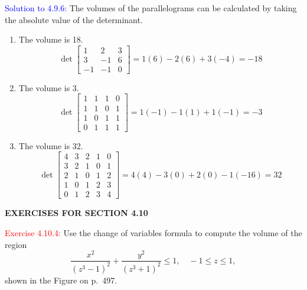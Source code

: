 \documentclass[12pt]{article}
\begin{document}
\textcolor{blue}{Solution to 4.9.6:}
The volumes of the parallelograms can be calculated 
by taking the absolute value of the determinant.
\begin{enumerate}
    \item 
        The volume is 18.
        \[
        \det 
        \begin{bmatrix}
            1 & 2 & 3 \\
            3 & -1 & 6 \\
            -1 & -1 & 0
        \end{bmatrix} 
        = 1(6)-2(6)+3(-4)
        =-18
        \]
        
    \item 
        The volume is 3.
        \[
        \det 
        \begin{bmatrix}
            1 & 1 & 1 & 0 \\
            1 & 1 & 0 & 1 \\
            1 & 0 & 1 & 1 \\
            0 & 1 & 1 & 1
        \end{bmatrix}
        = 1(-1) - 1(1) +1(-1)
        = -3
        \]
    \item 
        The volume is 32.
        \[
        \det 
        \begin{bmatrix}
            4 & 3 & 2 & 1 & 0 \\
            3 & 2 & 1 & 0 & 1 \\
            2 & 1 & 0 & 1 & 2 \\
            1 & 0 & 1 & 2 & 3 \\
            0 & 1 & 2 & 3 & 4
        \end{bmatrix}
        =4(4) - 3(0) + 2(0) - 1(-16)
        = 32
        \]     
\end{enumerate}


\newpage

\begin{center}
   \textbf{EXERCISES FOR SECTION 4.10}
\end{center}

\textcolor{red}{Exercise 4.10.4:}
Use the change of variables formula to compute the volume of the region
\begin{equation*}
    \frac{x^2}{(z^3-1)^2} + \frac{y^2}{(z^3+1)^2} \leq 1, \quad -1\leq z\leq 1 ,
\end{equation*}
shown in the Figure on p.~497.\medskip
\end{document}
